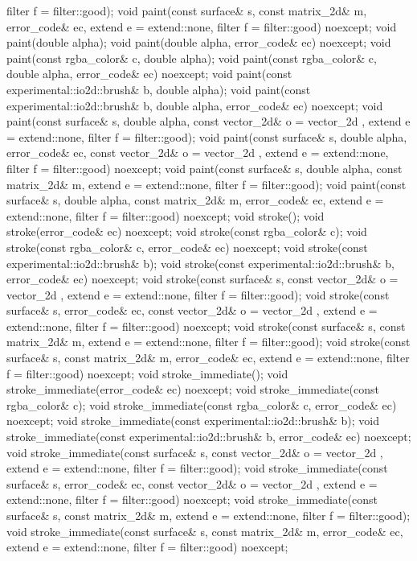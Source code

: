 \begin{codeblock}
{{{{{      filter f = filter::good);
    void paint(const surface& s, const matrix_2d& m, error_code& ec,
      extend e = extend::none, filter f = filter::good) noexcept;
    void paint(double alpha);
    void paint(double alpha, error_code& ec) noexcept;
    void paint(const rgba_color& c, double alpha);
    void paint(const rgba_color& c, double alpha, error_code& ec) noexcept;
    void paint(const experimental::io2d::brush& b, double alpha);
    void paint(const experimental::io2d::brush& b, double alpha,
      error_code& ec) noexcept;
    void paint(const surface& s, double alpha,
      const vector_2d& o = vector_2d{ }, extend e = extend::none,
      filter f = filter::good);
    void paint(const surface& s, double alpha, error_code& ec,
      const vector_2d& o = vector_2d{ }, extend e = extend::none,
      filter f = filter::good) noexcept;
    void paint(const surface& s, double alpha, const matrix_2d& m,
      extend e = extend::none, filter f = filter::good);
    void paint(const surface& s, double alpha, const matrix_2d& m,
      error_code& ec, extend e = extend::none, filter f = filter::good)
      noexcept;
    void stroke();
    void stroke(error_code& ec) noexcept;
    void stroke(const rgba_color& c);
    void stroke(const rgba_color& c, error_code& ec) noexcept;
    void stroke(const experimental::io2d::brush& b);
    void stroke(const experimental::io2d::brush& b, error_code& ec) noexcept;
    void stroke(const surface& s, const vector_2d& o = vector_2d{ },
      extend e = extend::none, filter f = filter::good);
    void stroke(const surface& s, error_code& ec,
      const vector_2d& o = vector_2d{ },
      extend e = extend::none, filter f = filter::good) noexcept;
    void stroke(const surface& s, const matrix_2d& m, extend e = extend::none,
      filter f = filter::good);
    void stroke(const surface& s, const matrix_2d& m, error_code& ec,
      extend e = extend::none, filter f = filter::good) noexcept;
    void stroke_immediate();
    void stroke_immediate(error_code& ec) noexcept;
    void stroke_immediate(const rgba_color& c);
    void stroke_immediate(const rgba_color& c, error_code& ec) noexcept;
    void stroke_immediate(const experimental::io2d::brush& b);
    void stroke_immediate(const experimental::io2d::brush& b, error_code& ec)
      noexcept;
    void stroke_immediate(const surface& s, const vector_2d& o = vector_2d{ },
      extend e = extend::none, filter f = filter::good);
    void stroke_immediate(const surface& s, error_code& ec,
      const vector_2d& o = vector_2d{ }, extend e = extend::none,
      filter f = filter::good) noexcept;
    void stroke_immediate(const surface& s, const matrix_2d& m,
      extend e = extend::none, filter f = filter::good);
    void stroke_immediate(const surface& s, const matrix_2d& m, error_code& ec,
      extend e = extend::none, filter f = filter::good) noexcept;
    
}}}}}
\end{codeblock}
